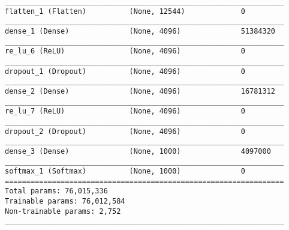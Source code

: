 \begin{lstlisting}[caption={Alexnet Classifier},captionpos=b,basicstyle=\tiny, label={lst:alexnet-classifier}]
_________________________________________________________________
flatten_1 (Flatten)          (None, 12544)             0
_________________________________________________________________
dense_1 (Dense)              (None, 4096)              51384320
_________________________________________________________________
re_lu_6 (ReLU)               (None, 4096)              0
_________________________________________________________________
dropout_1 (Dropout)          (None, 4096)              0
_________________________________________________________________
dense_2 (Dense)              (None, 4096)              16781312
_________________________________________________________________
re_lu_7 (ReLU)               (None, 4096)              0
_________________________________________________________________
dropout_2 (Dropout)          (None, 4096)              0
_________________________________________________________________
dense_3 (Dense)              (None, 1000)              4097000
_________________________________________________________________
softmax_1 (Softmax)          (None, 1000)              0
=================================================================
Total params: 76,015,336
Trainable params: 76,012,584
Non-trainable params: 2,752
_________________________________________________________________
\end{lstlisting}